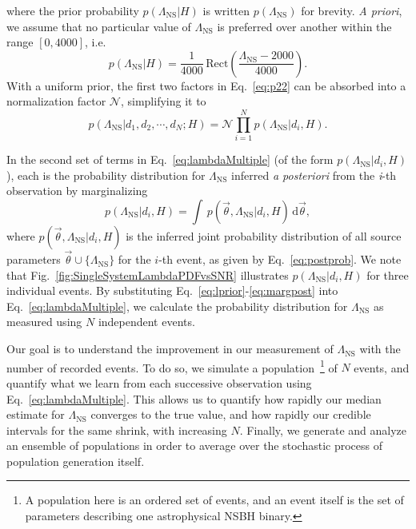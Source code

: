 \documentclass[aps,prd,amsmath,floats,floatfix, twocolumn,
superscriptaddress,nofootinbib,showpacs]{revtex4-1}
\newcommand{\D}{\mathrm{d}}
\newcommand{\lambdans}{\Lambda_\mathrm{NS}}
\begin{document}
% 
where the prior probability $p(\lambdans|H)$ is written $p(\lambdans)$ for
brevity. {\it A priori}, we assume that no particular value of $\lambdans$ is
preferred over another within the range $[0, 4000]$, i.e.
\begin{equation}\label{eq:lprior}
 p(\lambdans | H) = \dfrac{1}{4000}\,\mathrm{Rect}\left(\frac{\lambdans-2000}{4000}\right).
\end{equation}
With a uniform prior, the first two factors in Eq.~\ref{eq:p22} can be
absorbed into a normalization factor $\mathcal{N}$, simplifying it to
% 
\begin{equation}\label{eq:lambdaMultiple}
 p(\lambdans | d_1, d_2, \cdots, d_N; H) = \mathcal{N}\prod_{i=1}^N p(\lambdans | d_i, H).
\end{equation}
% 
% 

% 
In the second set of terms in Eq.~\ref{eq:lambdaMultiple} (of the form 
$p(\lambdans | d_i, H)$), each is the probability distribution for $\lambdans$
inferred {\it a posteriori} from the \textit{i}-th observation by marginalizing
\begin{equation}\label{eq:margpost}
 p(\lambdans | d_i, H) = \int\, p(\vec{\theta}, \lambdans | d_i, H)\, \D \vec{\theta},
\end{equation}
where $p(\vec{\theta}, \lambdans | d_i, H)$ is the inferred joint probability 
distribution of all source parameters $\vec{\theta}\cup\{\lambdans\}$ for the 
$i$-th event, as given by Eq.~\ref{eq:postprob}. We note that 
Fig.~\ref{fig:SingleSystemLambdaPDFvsSNR} illustrates $p(\lambdans | d_i, H)$
for three individual events. By substituting
Eq.~\ref{eq:lprior}-\ref{eq:margpost} into Eq.~\ref{eq:lambdaMultiple}, we
calculate the probability distribution for $\lambdans$ as measured using $N$
independent events.




Our goal is to understand the improvement in our measurement of $\lambdans$
with the number of recorded events. To do so, we simulate a population~\footnote{%
A population here is an ordered set of events, and an event itself is the 
set of parameters describing one astrophysical NSBH binary.}
of $N$ events, and quantify what we learn from each successive observation 
using Eq.~\ref{eq:lambdaMultiple}. This allows us to quantify how
rapidly our median estimate for $\lambdans$ converges to the true value,
and how rapidly our credible intervals for the same shrink, with increasing
$N$. Finally, we generate and analyze an ensemble of populations in order to
average over the stochastic process of population generation itself.
\end{document}
